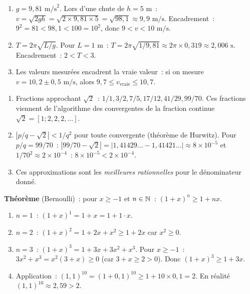 \begin{enumerate}
  \item $g=9{,}81\text{ m/s}^2$. Lors d'une chute de $h=5\text{ m}$~:
        $v=\sqrt{2gh}=\sqrt{2\times9{,}81\times5}=\sqrt{98{,}1}\approx9{,}9\text{ m/s}$.
        Encadrement~: $9^2=81<98{,}1<100=10^2$, donc $9<v<10\text{ m/s}$.
  \item $T=2\pi\sqrt{L/g}$. Pour $L=1\text{ m}$~:
        $T=2\pi\sqrt{1/9{,}81}\approx2\pi\times0{,}319\approx2{,}006\text{ s}$.
        Encadrement~: $2<T<3$.
  \item Les valeurs mesur\'ees encadrent la vraie valeur~: si on mesure $v=10{,}2\pm0{,}5\text{ m/s}$,
        alors $9{,}7\leq v_\text{vraie}\leq10{,}7$.
\end{enumerate}


\begin{enumerate}
  \item Fractions approchant $\sqrt{2}$~: $1/1, 3/2, 7/5, 17/12, 41/29, 99/70$.
        Ces fractions viennent de l'algorithme des convergentes de la fraction
        continue $\sqrt{2}=[1;2,2,2,\ldots]$.
  \item $|p/q-\sqrt{2}|<1/q^2$ pour toute convergente (th\'eor\`eme de Hurwitz).
        Pour $p/q=99/70$~: $|99/70-\sqrt{2}|=|1{,}41429\ldots-1{,}41421\ldots|\approx8\times10^{-5}$
        et $1/70^2\approx2\times10^{-4}$~: $8\times10^{-5}<2\times10^{-4}$.\checkmark
  \item Ces approximations sont les \emph{meilleures rationnelles} pour le d\'enominateur donn\'e.
\end{enumerate}


\textbf{Th\'eor\`eme} (Bernoulli)~: pour $x\geq-1$ et $n\in\mathbb{N}$~:
$(1+x)^n\geq1+nx$.

\begin{enumerate}
  \item $n=1$~: $(1+x)^1=1+x=1+1\cdot x$.\checkmark
  \item $n=2$~: $(1+x)^2=1+2x+x^2\geq1+2x$ car $x^2\geq0$.\checkmark
  \item $n=3$~: $(1+x)^3=1+3x+3x^2+x^3$.
        Pour $x\geq-1$~: $3x^2+x^3=x^2(3+x)\geq0$ (car $3+x\geq2>0$).
        Donc $(1+x)^3\geq1+3x$.\checkmark
  \item Application~: $(1{,}1)^{10}=(1+0{,}1)^{10}\geq1+10\times0{,}1=2$.
        En r\'ealit\'e $(1{,}1)^{10}\approx2{,}59>2$.\checkmark
\end{enumerate}


